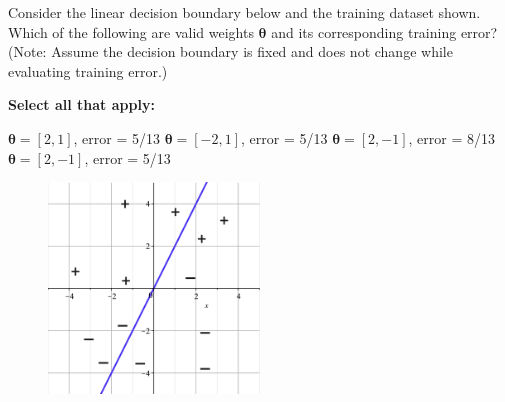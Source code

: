 \documentclass[11pt,addpoints,answers]{exam}
\numberwithin{equation}{section} %
\numberwithin{figure}{section} %
\numberwithin{table}{section} %
\begin{document}
\begin{questions}
    
    \question[2] Consider the linear decision boundary below and the training dataset shown. Which of the following are valid weights $\bm{\theta}$ and its corresponding training error? (Note: Assume the decision boundary is fixed and does not change while evaluating training error.)
    
    \textbf{Select all that apply:}
    {%
    \checkboxchar{$\Box$} \checkedchar{$\blacksquare$}
    \begin{checkboxes}
        \choice $\bm{\theta} = [2,1]$, error  = 5/13
        \CorrectChoice $\bm{\theta} = [-2,1]$, error = 5/13
        \CorrectChoice $\bm{\theta} = [2,-1]$, error = 8/13
        \CorrectChoice $\bm{\theta} = [2,-1]$, error = 5/13
    \end{checkboxes}
    }
    
    
    \begin{figure}[H]
        \centering
        \includegraphics[width = 0.5\textwidth]{perceptron_boundary.png}
        \label{Q_10perceptron}
    \end{figure}
    

    \clearpage
\end{questions}
\end{document}
